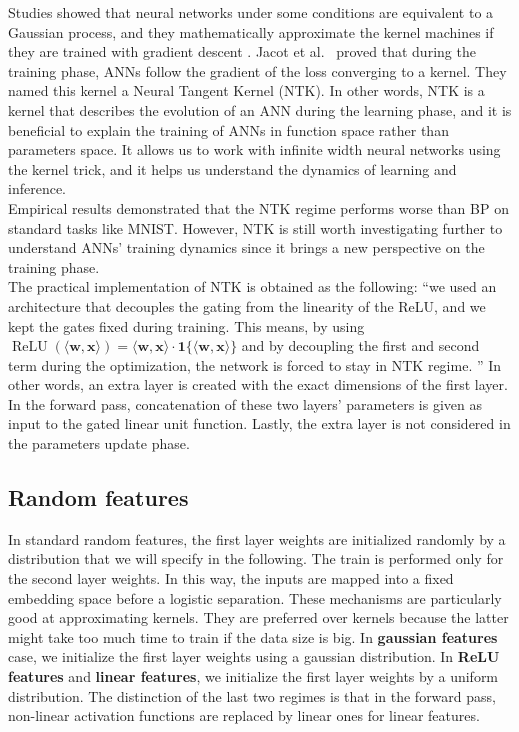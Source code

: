 \documentclass[a4paper, nobind]{templates/ociamthesis}
\begin{document}
Studies showed that neural networks under some conditions are equivalent to a Gaussian process, and they mathematically approximate the kernel machines if they are trained with gradient descent \cite{lee2018deep, domingos2020model}. Jacot et al.~\cite{DBLP:journals/corr/abs-1806-07572} proved that during the training phase, ANNs follow the gradient of the loss converging to a kernel. They named this kernel a Neural Tangent Kernel (NTK). In other words, NTK is a kernel that describes the evolution of an ANN during the learning phase, and it is beneficial to explain the training of ANNs in function space rather than parameters space. It allows us to work with infinite width neural networks using the kernel trick, and it helps us understand the dynamics of learning and inference.\\
Empirical results demonstrated that the NTK regime performs worse than BP on standard tasks like MNIST. However, NTK is still worth investigating further to understand ANNs' training dynamics since it brings a new perspective on the training phase.\\
The practical implementation of NTK is obtained as the following: ``we used an architecture that decouples the gating from the linearity of the ReLU, and we kept the gates fixed during training. This means, by using \(\operatorname{ReLU}(\langle\mathbf{w}, \mathbf{x}\rangle)=\langle\mathbf{w}, \mathbf{x}\rangle \cdot \mathbf{1}\{\langle\mathbf{w}, \mathbf{x}\rangle\}\) and by decoupling the first and second term during the optimization, the network is forced to stay in NTK regime. \cite{DBLP:journals/corr/abs-2002-07400}'' In other words, an extra layer is created with the exact dimensions of the first layer. In the forward pass, concatenation of these two layers' parameters is given as input to the gated linear unit function. Lastly, the extra layer is not considered in the parameters update phase.

\hypertarget{random-features}{%
\subsection{Random features}\label{random-features}}

In standard random features, the first layer weights are initialized randomly by a distribution that we will specify in the following. The train is performed only for the second layer weights. In this way, the inputs are mapped into a fixed embedding space before a logistic separation. These mechanisms are particularly good at approximating kernels. They are preferred over kernels because the latter might take too much time to train if the data size is big. In \textbf{gaussian features} case, we initialize the first layer weights using a gaussian distribution. In \textbf{ReLU features} and \textbf{linear features}, we initialize the first layer weights by a uniform distribution. The distinction of the last two regimes is that in the forward pass, non-linear activation functions are replaced by linear ones for linear features.
\end{document}
